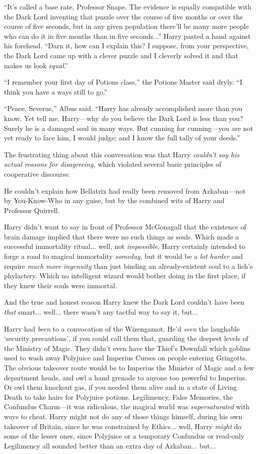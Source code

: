 “It’s called a base rate, Professor Snape. The evidence is equally compatible with the Dark Lord inventing that puzzle over the course of five months or over the course of five seconds, but in any given population there’ll be many more people who can do it in five months than in five seconds...” Harry pasted a hand against his forehead. “Darn it, how can I explain this? I suppose, from your perspective, the Dark Lord came up with a clever puzzle and I cleverly solved it and that makes us look \emph{equal}.”

“I remember your first day of Potions class,” the Potions Master said dryly. “I think you have a ways still to go.”

“Peace, Severus,” Albus said. “Harry has already accomplished more than you know. Yet tell me, Harry—why \emph{do} you believe the Dark Lord is less than you? Surely he is a damaged soul in many ways. But cunning for cunning—you are not yet ready to face him, I would judge; and I know the full tally of your deeds.”
\sbreak

The frustrating thing about this conversation was that Harry \emph{couldn’t say his actual reasons for disagreeing,} which violated several basic principles of cooperative discourse.

He couldn’t explain how Bellatrix had really been removed from Azkaban—not by You-Know-Who in any guise, but by the combined wits of Harry and Professor Quirrell.

Harry didn’t want to say in front of Professor McGonagall that the existence of brain damage implied that there were no such things as souls. Which made a successful immortality ritual... well, not \emph{impossible,} Harry certainly intended to forge a road to magical immortality \emph{someday}, but it would be a \emph{lot harder} and require \emph{much more ingenuity} than just binding an already-existent soul to a lich’s phylactery. Which no intelligent wizard would bother doing in the first place, if they knew their souls were immortal.

And the true and honest reason Harry knew the Dark Lord couldn’t have been \emph{that} smart... well... there wasn’t any tactful way to say it, but...

Harry had \emph{been} to a convocation of the Wizengamot. He’d \emph{seen} the laughable ‘security precautions’, if you could call them that, guarding the deepest levels of the Ministry of Magic. They didn’t even have the Thief’s Downfall which goblins used to wash away Polyjuice and Imperius Curses on people entering Gringotts. The obvious takeover route would be to Imperius the Minister of Magic and a few department heads, and owl a hand grenade to anyone too powerful to Imperius. Or owl them knockout gas, if you needed them alive and in a state of Living Death to take hairs for Polyjuice potions. Legilimency, False Memories, the Confundus Charm—it was ridiculous, the magical world was \emph{supersaturated} with ways to cheat. Harry might not do any of those things himself, during his own takeover of Britain, since he was constrained by Ethics... well, Harry \emph{might} do some of the lesser ones, since Polyjuice or a temporary Confundus or read-only Legilimency all sounded better than an extra day of Azkaban... but...

